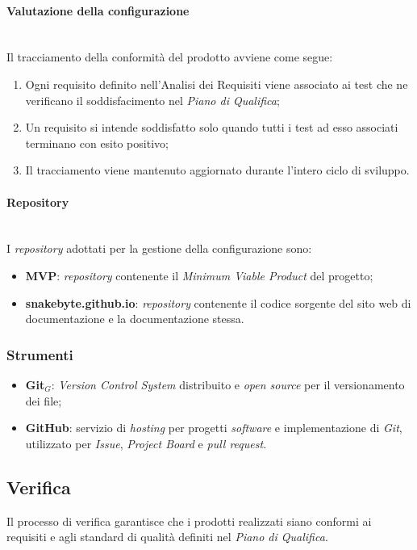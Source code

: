 \documentclass[10pt, letterpaper]{article}
\newcommand{\trisubsection}[1]{\paragraph{#1}\mbox{}\\}
\begin{document}
\trisubsection{Valutazione della configurazione}
Il tracciamento della conformità del prodotto avviene come segue:
\begin{enumerate}
    \item Ogni requisito definito nell'Analisi dei Requisiti viene associato ai test che ne verificano il soddisfacimento nel \textit{Piano di Qualifica};
    \item Un requisito si intende soddisfatto solo quando tutti i test ad esso associati terminano con esito positivo;
    \item Il tracciamento viene mantenuto aggiornato durante l'intero ciclo di sviluppo.
\end{enumerate}

\trisubsection{Repository}
I \textit{repository} adottati per la gestione della configurazione sono:
\begin{itemize}
    \item \textbf{MVP}: \textit{repository} contenente il \textit{Minimum Viable Product} del progetto;
    \item \textbf{snakebyte.github.io}: \textit{repository} contenente il codice sorgente del sito web di documentazione e la documentazione stessa.
\end{itemize}

\subsubsection{Strumenti}
\begin{itemize}
    \item \textbf{Git}$_{G}$: \textit{Version Control System} distribuito e \textit{open source} per il versionamento dei file;
    \item \textbf{GitHub}: servizio di \textit{hosting} per progetti \textit{software} e implementazione di \textit{Git}, utilizzato per \textit{Issue}, \textit{Project Board} e \textit{pull request}.
\end{itemize}


\subsection{Verifica}
Il processo di verifica garantisce che i prodotti realizzati siano conformi ai requisiti e agli standard di qualità definiti nel \textit{Piano di Qualifica}.
\end{document}
